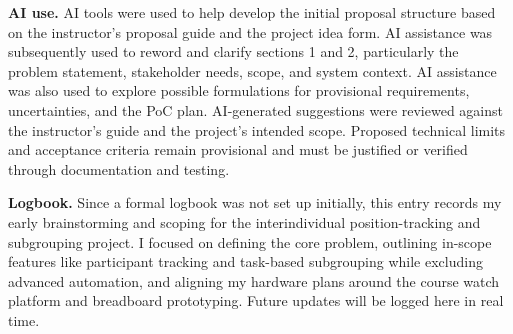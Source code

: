 \documentclass[10pt]{article}
\begin{document}
\textbf{AI use.}
AI tools were used to help develop the initial proposal
structure based on the instructor's proposal guide and the
project idea form. AI assistance was subsequently used to
reword and clarify sections 1 and 2, particularly the problem
statement, stakeholder needs, scope, and system context.
AI assistance was also used to explore possible formulations
for provisional requirements, uncertainties, and the PoC plan.
AI-generated suggestions were reviewed against the instructor's
guide and the project's intended scope. Proposed technical
limits and acceptance criteria remain provisional and must
be justified or verified through documentation and testing.

\textbf{Logbook.}
Since a formal logbook was not set up initially, this entry records my early brainstorming and scoping for the interindividual position-tracking and subgrouping project. I focused on defining the core problem, outlining in-scope features like participant tracking and task-based subgrouping while excluding advanced automation, and aligning my hardware plans around the course watch platform and breadboard prototyping. Future updates will be logged here in real time.
\end{document}
